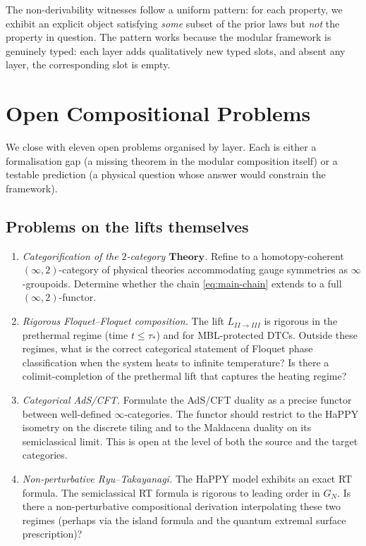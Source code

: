 \documentclass[12pt]{article}
\theoremstyle{definition}
\theoremstyle{remark}
\newcommand{\Theory}{\mathbf{Theory}}
\begin{document}
The non-derivability witnesses follow a uniform pattern: for each property,
we exhibit an explicit object satisfying \emph{some} subset of the prior
laws but \emph{not} the property in question. The pattern works because the
modular framework is genuinely typed: each layer adds qualitatively new
typed slots, and absent any layer, the corresponding slot is empty.

\section{Open Compositional Problems}
\label{sec:open}

We close with eleven open problems organised by layer. Each is either a
formalisation gap (a missing theorem in the modular composition itself) or a
testable prediction (a physical question whose answer would constrain the
framework).

\subsection*{Problems on the lifts themselves}

\begin{enumerate}[label=O\arabic*., leftmargin=2.6em]

\item \emph{Categorification of the $2$-category $\Theory$.}
Refine  to a homotopy-coherent $(\infty,2)$-category of
physical theories accommodating gauge symmetries as $\infty$-groupoids.
Determine whether the chain \eqref{eq:main-chain} extends to a full
$(\infty, 2)$-functor.

\item \emph{Rigorous Floquet--Floquet composition.}
The lift $L_{II \to III}$ is rigorous in the prethermal regime (time $t
\leq \tau_*$) and for MBL-protected DTCs. Outside these regimes, what is the
correct categorical statement of Floquet phase classification when the
system heats to infinite temperature? Is there a colimit-completion of the
prethermal lift that captures the heating regime?

\item \emph{Categorical AdS/CFT.}
Formulate the AdS/CFT duality as a precise functor between well-defined
$\infty$-categories. The functor should restrict to the HaPPY isometry on
the discrete tiling and to the Maldacena duality on its semiclassical limit.
This is open at the level of both the source and the target categories.

\item \emph{Non-perturbative Ryu--Takayanagi.}
The HaPPY model exhibits an exact RT formula. The semiclassical RT formula
\cite{ryutakayanagi2006} is rigorous to leading order in $G_N$. Is there a
non-perturbative compositional derivation interpolating these two regimes
(perhaps via the island formula and the quantum extremal surface
prescription)?

\end{enumerate}
\end{document}
